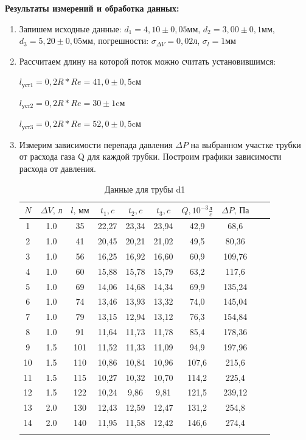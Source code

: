 \documentclass[a4paper, 12pt]{article}%
\begin{document}
	\textbf{Результаты измерений и обработка данных:}
	\begin{enumerate}


		
	\item Запишем исходные данные: $d_1=4,10\pm 0,05$мм, $d_2=3,00\pm 0,1$мм, $d_3=5,20\pm 0,05$мм, погрешности: $\sigma_{\Delta V}=0,02$л,  $\sigma_{l}= 1$мм
	
	
	 \item Рассчитаем длину на которой поток можно считать  установившимся:
	 
	  $l_\text{уст1}=0,2R*Re=41,0\pm0,5$cм
	 
	$l_\text{уст2}=0,2R*Re=30\pm1$cм
	
	$l_\text{уст3}=0,2R*Re=52,0\pm0,5$cм
	\newpage
	
\item Измерим зависимости перепада давления $\Delta P$ на выбранном участке
	трубки от расхода газа Q для каждой трубки. Построим графики зависимости расхода от давления.
	
\begin{longtable}{|c|c|c|c|c|c|c|c|c|c|} \hline
	$N$ &  $\Delta V, \, \text{л}$  &   $l,\, \text{мм}$ &     $t_1, c$ &     $t_2, c$ &     $t_3, c$ &    $ Q, 10^{-3} \frac{\text{л}}{c} $ & $\Delta P, \, \text{Па}$\\ \hline
	1& 1.0   &  35 &  22,27 &  23,34 &  23,94 &    42,9 &   68,6\\ \hline
	2&   1.0 &  41 &  20,45 &  20,21 &  21,02 &    49,5 &   80,36\\ \hline
	3 &   1.0 &  56 &  16,25 &  16,92 &  16,60 &    60,9 &   109,76 \\ \hline
	4 &   1.0 &  60 &  15,88 &  15,78 &  15,79 &    63,2 &   117,6 \\ \hline
	5 &   1.0 &  69 &  14,06 &  14,68 &  14,34 &    69,9 &   135,24 \\ \hline
	6 &   1.0 &  74 &  13,46 &  13,93 &  13,32 &    74,0 &   145,04 \\ \hline
	7 &   1.0 &  79 &  13,15 &  12,94 &  13,12 &   76,3 &   154,84 \\\hline
	8 &   1.0 &  91 &  11,64 &  11,73 &  11,78 &    85,4 &   178,36 \\ \hline
	9 &   1.5 &  101 &  11,52 &  11,33 &  11,09 &    94,9 &   197,96 \\ \hline
	10 &  1.5 &  110 &  10,86 &  10,84 &  10,96 &    107,6 &  215,6 \\ \hline
	11 &  1.5 &  115 &  10,27 &  10,32 &  10,70 &    114,2 &  225,4 \\ \hline
	12 &  1.5 &  122 &  10,24 &  9,86 &  9,81 &  121,5 &  239,12 \\ \hline
	13 &  2.0 &  130 &  12,43 &  12,59 &  12,47 &    131,2 &  254,8 \\ \hline
	14&  2.0  &  140 & 11,95 &  11,58 &  12,42 &   146,6 &  274,4 \\ \hline
	\caption{ Данные для трубы d1}
\end{longtable}


\end{enumerate}
\end{document}
